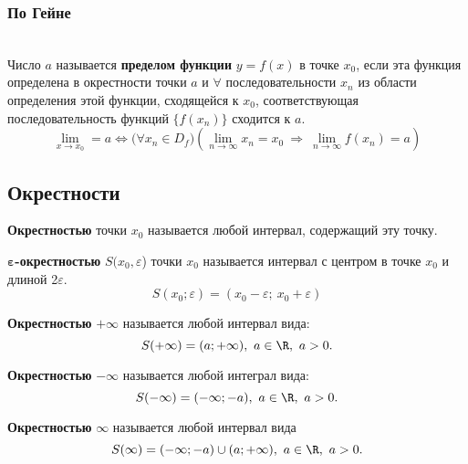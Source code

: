 \subsubsection{По Гейне}

\begin{definition}\ \\
  Число $a$ называется \textbf{пределом функции} $y = f\left( x \right) $ в точке $x_0$, если эта функция определена в окрестности точки $a$ и $\forall$ последовательности $x_{n}$ из области определения этой функции, сходящейся к $x_0$, соответствующая последовательность функций $\{f(x_{n})\}$ сходится к $a$.
  \[
  \lim_{x \to x_0} = a \iff \big(\forall x_{n}\in D_f\big)\left(\lim\limits_{n \to \infty} x_{n} = x_0\ \Rightarrow\ \lim\limits_{n \to \infty} f(x_{n}) = a\right) 
  \] 
\end{definition}
\newpage
\subsection{Окрестности}

\begin{definition}
  \textbf{Окрестностью} точки $x_0$ называется любой интервал, содержащий эту точку.
\end{definition}

\begin{definition}
  $\bm{\varepsilon}$\textbf{-окрестностью} $S(x_0, \varepsilon$) точки $x_0$ называется интервал с центром в точке $x_0$ и длиной 2$\varepsilon$.
  \[
  S(x_0; \varepsilon) = (x_0 - \varepsilon;\ x_0 + \varepsilon)
  \] 
\end{definition}

\begin{definition}
  \textbf{Окрестностью} $\bm{+\infty}$ называется любой интервал вида:
  \[
  S(+\infty) = (a; +\infty),\ a\in \R,\ a > 0
  .\] 
\end{definition}

\begin{definition}
  \textbf{Окрестностью} $\bm{-\infty}$ называется любой интеграл вида:
  \[
  S(-\infty) = (-\infty; -a),\ a\in \R,\ a > 0
  .\] 
\end{definition}

\begin{definition}
  \textbf{Окрестностью} $\bm{\infty}$ называется любой интервал вида
  \[
  S(\infty) = (-\infty; -a) \cup (a; +\infty),\ a\in \R,\ a > 0
  .\] 
\end{definition}

